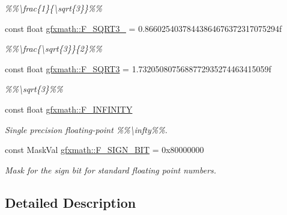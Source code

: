 \begin{DoxyCompactItemize}
\begin{DoxyCompactList}\small\item\em \%\%\textbackslash{}frac\{1\}\{\textbackslash{}sqrt\{3\}\}\%\% \end{DoxyCompactList}\item 
\hypertarget{group___math_consts_ga3fef44c3a45acdde18067f03eb073098}{}const float \hyperlink{group___math_consts_ga3fef44c3a45acdde18067f03eb073098}{gfxmath\+::\+F\+\_\+\+S\+Q\+R\+T3\+\_} = 0.\+86602540378443864676372317075294f\label{group___math_consts_ga3fef44c3a45acdde18067f03eb073098}

\begin{DoxyCompactList}\small\item\em \%\%\textbackslash{}frac\{\textbackslash{}sqrt\{3\}\}\{2\}\%\% \end{DoxyCompactList}\item 
\hypertarget{group___math_consts_ga1e7def1903a3d92805ba4ed841ee1bbf}{}const float \hyperlink{group___math_consts_ga1e7def1903a3d92805ba4ed841ee1bbf}{gfxmath\+::\+F\+\_\+\+S\+Q\+R\+T3} = 1.\+7320508075688772935274463415059f\label{group___math_consts_ga1e7def1903a3d92805ba4ed841ee1bbf}

\begin{DoxyCompactList}\small\item\em \%\%\textbackslash{}sqrt\{3\}\%\% \end{DoxyCompactList}\item 
const float \hyperlink{group___math_consts_gaa4b8aaaeaf14dfc8a07938655564fcf7}{gfxmath\+::\+F\+\_\+\+I\+N\+F\+I\+N\+I\+T\+Y}
\begin{DoxyCompactList}\small\item\em Single precision floating-\/point \%\%\textbackslash{}infty\%\%. \end{DoxyCompactList}\item 
const Mask\+Val \hyperlink{group___math_consts_gad2489c06f986e5af29bfb5c2eaca185f}{gfxmath\+::\+F\+\_\+\+S\+I\+G\+N\+\_\+\+B\+I\+T} = 0x80000000
\begin{DoxyCompactList}\small\item\em Mask for the sign bit for standard floating point numbers. \end{DoxyCompactList}\end{DoxyCompactItemize}


\subsection{Detailed Description}



